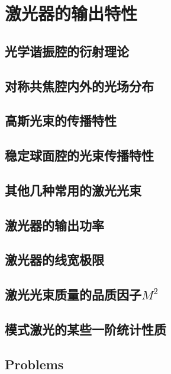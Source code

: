 \chapter{激光器的输出特性}
\section{光学谐振腔的衍射理论}
\section{对称共焦腔内外的光场分布}
\section{高斯光束的传播特性}
\section{稳定球面腔的光束传播特性}
\section{其他几种常用的激光光束}
\section{激光器的输出功率}
\section{激光器的线宽极限}
\section{激光光束质量的品质因子\texorpdfstring{$M^2$}{M\^2}}
\section{模式激光的某些一阶统计性质}
\newpage
\section*{Problems}